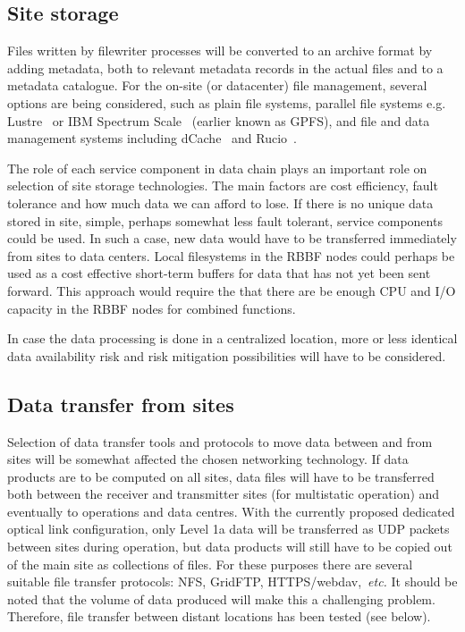 \documentclass[12pt,a4paper]{article}
\begin{document}
\subsection{Site storage}
Files written by filewriter processes will be converted to an archive format by adding metadata, both to relevant metadata records in the actual files and to a metadata catalogue. 
For the on-site (or datacenter) file management, several options are being considered, such as plain file systems, parallel file systems e.g. Lustre~\cite{lustre} or IBM Spectrum Scale~\cite{ibm-gpfs} (earlier known as GPFS), and file and data management systems including dCache~\cite{dcache} and Rucio~\cite{rucio}.


The role of each service component in data chain plays an important role on selection of site storage technologies. The main factors are cost efficiency, fault tolerance and how much data we can afford to lose. 
If there is no unique data stored in site, simple, perhaps somewhat less fault tolerant, service components could be used. 
In such a case, new data would have to be transferred immediately from sites to data centers.
Local filesystems in the RBBF nodes could perhaps be used as a cost effective short-term buffers for data that has not yet been sent forward. 
This approach would require the that there are be enough CPU and I/O capacity in the RBBF nodes for combined functions.

In case the data processing is done in a centralized location, more or less identical data availability risk and risk mitigation possibilities will have to be considered. 

\subsection{Data transfer from sites}

Selection of data transfer tools and protocols to move data between and from sites will be somewhat affected the chosen networking technology. 
If data products are to be computed on all sites, data files will have to be transferred both between the receiver and transmitter sites (for multistatic operation) and eventually to operations and data centres. With the currently proposed dedicated optical link configuration, only Level 1a data will be transferred as UDP packets between sites during operation, but data products will still have to be copied out of the main site as collections of files.
For these purposes there are several suitable file transfer protocols: NFS, GridFTP, HTTPS/webdav,~\emph{etc.}  It should be noted that the volume of data produced will make this a challenging problem.  Therefore, file transfer between distant locations has been tested (see below).
\end{document}
